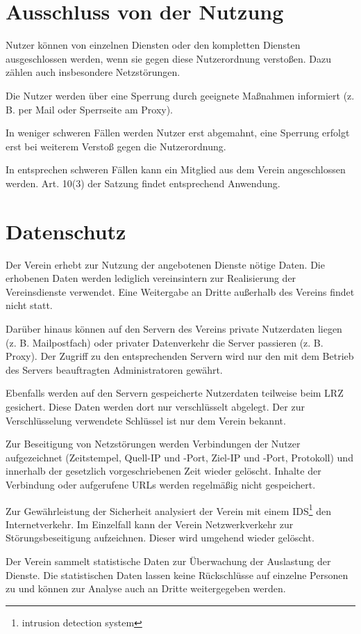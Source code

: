 \documentclass[a4paper,10pt]{scrartcl}
\begin{document}
\section{Ausschluss von der Nutzung}
Nutzer können von einzelnen Diensten oder den kompletten Diensten ausgeschlossen werden, wenn sie gegen diese Nutzerordnung verstoßen. Dazu zählen auch insbesondere Netzstörungen.

Die Nutzer werden über eine Sperrung durch geeignete Maßnahmen informiert (z. B. per Mail oder Sperrseite am Proxy).

In weniger schweren Fällen werden Nutzer erst abgemahnt, eine Sperrung erfolgt erst bei weiterem Verstoß gegen die Nutzerordnung.

In entsprechen schweren Fällen kann ein Mitglied aus dem Verein angeschlossen werden. Art. 10(3) der Satzung findet entsprechend Anwendung. 

\section{Datenschutz}
Der Verein erhebt zur Nutzung der angebotenen Dienste nötige Daten. Die erhobenen Daten werden lediglich vereinsintern zur Realisierung der Vereinsdienste verwendet. Eine Weitergabe an Dritte außerhalb des Vereins findet nicht statt.

Darüber hinaus können auf den Servern des Vereins private Nutzerdaten liegen (z. B. Mailpostfach) oder privater Datenverkehr die Server passieren (z. B. Proxy). Der Zugriff zu den entsprechenden Servern wird nur den mit dem Betrieb des Servers beauftragten Administratoren gewährt.

Ebenfalls werden auf den Servern gespeicherte Nutzerdaten teilweise beim LRZ gesichert. Diese Daten werden dort nur verschlüsselt abgelegt. Der zur Verschlüsselung verwendete Schlüssel ist nur dem Verein bekannt.

Zur Beseitigung von Netzstörungen werden Verbindungen der Nutzer aufgezeichnet (Zeitstempel, Quell-IP und -Port, Ziel-IP und -Port, Protokoll) und innerhalb der gesetzlich vorgeschriebenen Zeit wieder gelöscht. Inhalte der Verbindung oder aufgerufene URLs werden regelmäßig nicht gespeichert.

Zur Gewährleistung der Sicherheit analysiert der Verein mit einem IDS\footnote{intrusion detection system} den Internetverkehr. Im Einzelfall kann der Verein Netzwerkverkehr zur Störungsbeseitigung aufzeichnen. Dieser wird umgehend wieder gelöscht.

Der Verein sammelt statistische Daten zur Überwachung der Auslastung der Dienste. Die statistischen Daten lassen keine Rückschlüsse auf einzelne Personen zu und können zur Analyse auch an Dritte weitergegeben werden.
\end{document}
